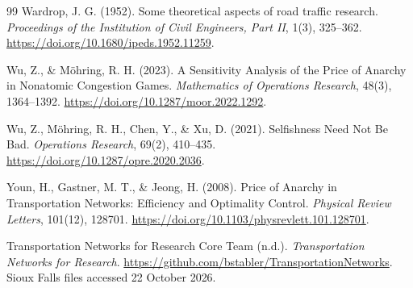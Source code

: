 \begin{thebibliography}{99}
Wardrop, J. G. (1952). Some theoretical aspects of road traffic research. \emph{Proceedings of the Institution of Civil Engineers, Part II}, 1(3), 325--362. \url{https://doi.org/10.1680/ipeds.1952.11259}.

Wu, Z., \& M{\"o}hring, R. H. (2023). A Sensitivity Analysis of the Price of Anarchy in Nonatomic Congestion Games. \emph{Mathematics of Operations Research}, 48(3), 1364--1392. \url{https://doi.org/10.1287/moor.2022.1292}.

Wu, Z., M{\"o}hring, R. H., Chen, Y., \& Xu, D. (2021). Selfishness Need Not Be Bad. \emph{Operations Research}, 69(2), 410--435. \url{https://doi.org/10.1287/opre.2020.2036}.

Youn, H., Gastner, M. T., \& Jeong, H. (2008). Price of Anarchy in Transportation Networks: Efficiency and Optimality Control. \emph{Physical Review Letters}, 101(12), 128701. \url{https://doi.org/10.1103/physrevlett.101.128701}.

Transportation Networks for Research Core Team (n.d.). \emph{Transportation Networks for Research}. \url{https://github.com/bstabler/TransportationNetworks}. Sioux Falls files accessed 22 October 2026.

\end{thebibliography}
